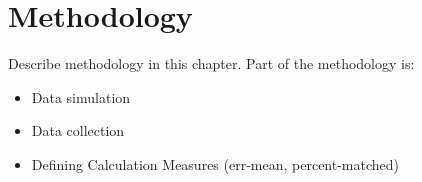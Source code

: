 \section{Methodology}
\label{chap:methodology}

Describe methodology in this chapter. Part of the methodology is:

\begin{itemize}
  \item Data simulation
  \item Data collection
  \item Defining Calculation Measures (err-mean, percent-matched)
\end{itemize}
